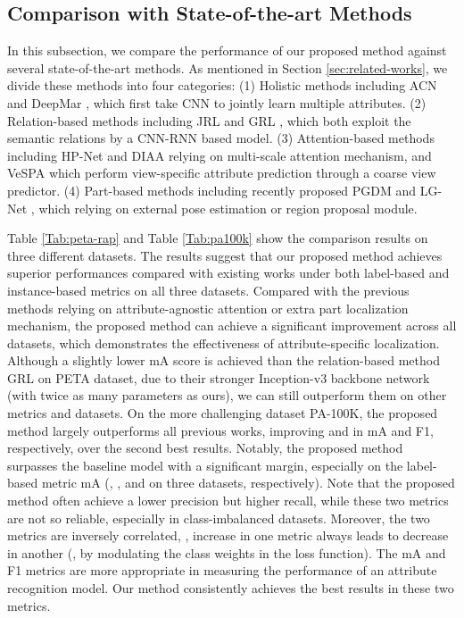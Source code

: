 \documentclass[10pt,twocolumn,letterpaper]{article}
\begin{document}
\subsection{Comparison with State-of-the-art Methods}
In this subsection, we compare the performance of our proposed method against several state-of-the-art methods.
As mentioned in Section \ref{sec:related-works}, we divide these methods into four categories:
(1) Holistic methods including ACN \cite{sudowe2015person} and DeepMar \cite{deepmar}, which first take CNN to jointly learn multiple attributes.
(2) Relation-based methods including JRL \cite{wang2017attribute} and GRL \cite{zhao2018grouping}, which both exploit the semantic relations by a CNN-RNN based model.
(3) Attention-based methods including HP-Net \cite{hpnet} and DIAA \cite{liu2018localization} relying on multi-scale attention mechanism, and VeSPA \cite{deepview} which perform view-specific attribute prediction through a coarse view predictor.
(4) Part-based methods including recently proposed PGDM \cite{li2018pose} and LG-Net \cite{liu2018localization}, which relying on external pose estimation or region proposal module.

Table \ref{Tab:peta-rap} and Table \ref{Tab:pa100k} show the comparison results on three different datasets.
The results suggest that our proposed method achieves superior performances compared with existing works under both label-based and instance-based metrics on all three datasets.
Compared with the previous methods relying on attribute-agnostic attention or extra part localization mechanism, the proposed method can achieve a significant improvement across all datasets, which demonstrates the effectiveness of attribute-specific localization.
Although a slightly lower mA score is achieved than the relation-based method GRL on PETA dataset, due to their stronger Inception-v3 backbone network (with twice as many parameters as ours),
we can still outperform them on other metrics and datasets. On the more challenging dataset PA-100K, the proposed method largely outperforms all previous works, improving  and  in mA and F1, respectively, over the second best results.
Notably, the proposed method surpasses the baseline model with a significant margin, especially on the label-based metric mA (, , and  on three datasets, respectively).
Note that the proposed method often achieve a lower precision but higher recall, while these two metrics are not so reliable, especially in class-imbalanced datasets.
Moreover, the two metrics are inversely correlated, \ie, increase in one metric always leads to decrease in another (\eg, by modulating the class weights in the loss function).
The mA and F1 metrics are more appropriate in measuring the performance of an attribute recognition model.
Our method consistently achieves the best results in these two metrics.
\end{document}
